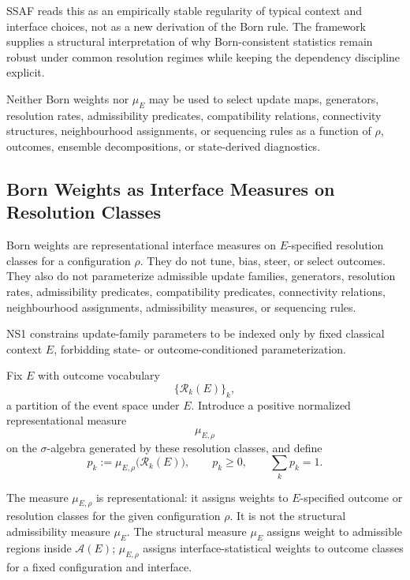 \documentclass[aps,prx,onecolumn,11pt]{revtex4-2}
\theoremstyle{plain}
\theoremstyle{definition}
\theoremstyle{remark}
\begin{document}
SSAF reads this as an empirically stable regularity of typical context
and interface choices, not as a new derivation of the Born rule. The
framework supplies a structural interpretation of why Born-consistent
statistics remain robust under common resolution regimes while keeping
the dependency discipline explicit.

Neither Born weights nor \(\mu_E\) may be used to select update maps,
generators, resolution rates, admissibility predicates, compatibility
relations, connectivity structures, neighbourhood assignments, or
sequencing rules as a function of \(\rho\), outcomes, ensemble
decompositions, or state-derived diagnostics.

\subsection{Born Weights as Interface Measures on Resolution Classes}
\label{subsec:born_rule_SSAF}

Born weights are representational interface measures on
\(E\)-specified resolution classes for a configuration \(\rho\). They
do not tune, bias, steer, or select outcomes. They also do not
parameterize admissible update families, generators, resolution rates,
admissibility predicates, compatibility predicates, connectivity
relations, neighbourhood assignments, admissibility measures, or
sequencing rules.

NS1 constrains update-family parameters to be indexed only by fixed
classical context \(E\), forbidding state- or outcome-conditioned
parameterization.

Fix \(E\) with outcome vocabulary
\[
\{\mathcal{R}_k(E)\}_k,
\]
a partition of the event space under \(E\). Introduce a positive
normalized representational measure
\[
\mu_{E,\rho}
\]
on the \(\sigma\)-algebra generated by these resolution classes, and
define
\begin{equation}
p_k
:=
\mu_{E,\rho}\bigl(\mathcal{R}_k(E)\bigr),
\qquad
p_k\geq 0,
\qquad
\sum_k p_k=1.
\label{eq:born_weight_measure_def}
\end{equation}

The measure \(\mu_{E,\rho}\) is representational: it assigns weights to
\(E\)-specified outcome or resolution classes for the given
configuration \(\rho\). It is not the structural admissibility measure
\(\mu_E\). The structural measure \(\mu_E\) assigns weight to admissible
regions inside \(\mathcal A(E)\); \(\mu_{E,\rho}\) assigns
interface-statistical weights to outcome classes for a fixed
configuration and interface.
\end{document}
